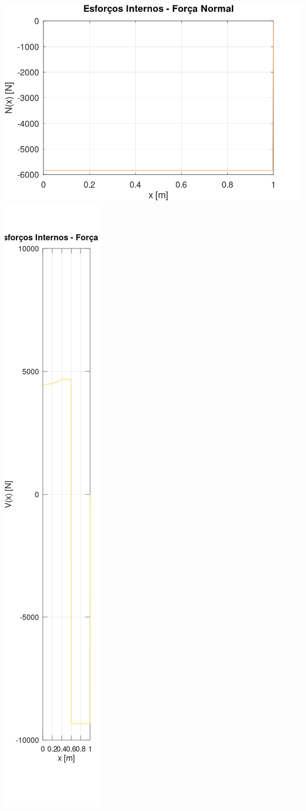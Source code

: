 \documentclass[10pt]{article}
\begin{document}
\begin{center}
    \includegraphics[scale=0.25]{figure1.png}
    \includegraphics[scale=0.25]{figure2.png}

\end{center}
\end{document}
